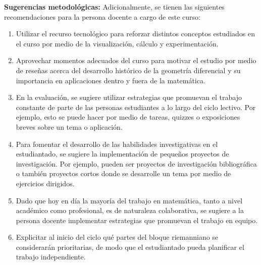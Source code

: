 \begin{refsection}
\textbf{Sugerencias metodológicas:} Adicionalmente, se tienen las siguientes recomendaciones para la persona docente a cargo de este curso:
\begin{enumerate}
    \item Utilizar el recurso tecnológico para reforzar distintos conceptos estudiados en el curso por medio de la visualización, cálculo y experimentación.
    \item Aprovechar momentos adecuados del curso para motivar el estudio por medio de reseñas acerca del desarrollo histórico de la geometría diferencial y su importancia en aplicaciones dentro y fuera de la matemática.
    \item En la evaluación, se sugiere utilizar estrategias que promuevan el trabajo constante de parte de las personas estudiantes a lo largo del ciclo lectivo. Por ejemplo, esto se puede hacer por medio de tareas, quizzes o exposiciones breves sobre un tema o aplicación.
    \item Para fomentar el desarrollo de las habilidades investigativas en el estudiantado, se sugiere la implementación de pequeños proyectos de investigación. Por ejemplo, pueden ser proyectos de investigación bibliográfica o también proyectos cortos donde se desarrolle un tema por medio de ejercicios dirigidos.
    \item Dado que hoy en día la mayoría del trabajo en matemática, tanto a nivel académico como profesional, es de naturaleza colaborativa, se sugiere a la persona docente implementar estrategias que promuevan el trabajo en equipo.
    \item Explicitar al inicio del ciclo qué partes del bloque riemanniano se considerarán prioritarias, de modo que el estudiantado pueda planificar el trabajo independiente.
\end{enumerate}

\nocite{Tu11}
\nocite{Lee13}
\nocite{Tu17}
\nocite{DoC92}
\nocite{GP74}
\nocite{DoC16}
\nocite{Kuh15}
\nocite{ONeil06}

\printcursosbibliography
\end{refsection}
